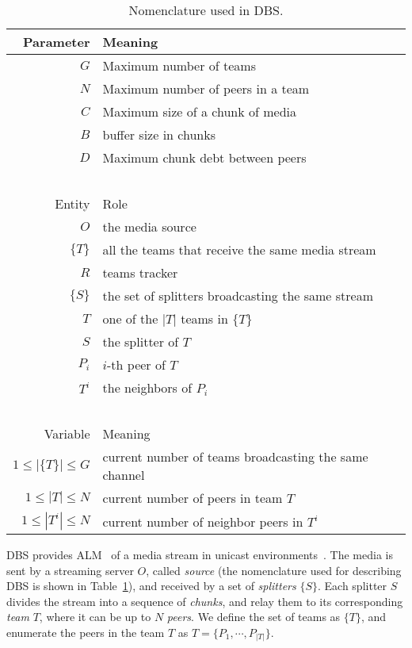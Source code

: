 \label{sec:DBS}

\begin{table}
  \begin{tabular}{rl}
    Parameter & Meaning \\
    \hline
    $G$       & Maximum number of teams \\
    $N$       & Maximum number of peers in a team \\
    $C$       & Maximum size of a chunk of media \\
    $B$       & buffer size in chunks \\
    $D$       & Maximum chunk debt between peers \\
    ~\\
    Entity  & Role \\
    \hline
    $O$     & the media source \\
    $\{T\}$ & all the teams that receive the same media stream \\
    $R$     & teams tracker \\
    $\{S\}$ & the set of splitters broadcasting the same stream \\
    $T$     & one of the $|T|$ teams in $\{T\}$ \\
    $S$     & the splitter of $T$ \\
    $P_i$   & $i$-th peer of $T$ \\
    $T^i$   & the neighbors of $P_i$ \\
    ~\\
    Variable            & Meaning \\
    \hline
    $1\leq |\{T\}|\leq G$ & current number of teams broadcasting the same channel \\
    $1\leq |T|\leq N$     & current number of peers in team $T$ \\
    $1\leq |T^i|\leq N$   & current number of neighbor peers in $T^i$ \\
  \end{tabular}
  \caption{Nomenclature used in DBS.\label{tab:DBS_nomenclature}}
\end{table}

DBS provides ALM~\cite{banerjee2002scalable} of a media stream in
unicast environments~\cite{comer2003computer}. The media is sent by a
streaming server $O$, called \emph{source} (the nomenclature used for
describing DBS is shown in Table~\ref{tab:DBS_nomenclature}), and
received by a set of \emph{splitters} $\{S\}$.
Each splitter $S$ divides the stream into a sequence of
\emph{chunks}, and relay them to its corresponding \emph{team} $T$,
where it can be up to $N$ \emph{peers}. We define the set of teams as
$\{T\}$,
and enumerate the peers in the team $T$ as $T=\{P_1,\cdots,P_{|T|}\}$.

